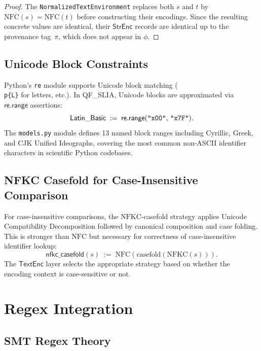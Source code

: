 \documentclass[11pt]{article}
\newcommand{\StrEnc}{\ensuremath{\mathsf{StrEnc}}}
\newcommand{\TextEnc}{\ensuremath{\mathsf{TextEnc}}}
\newcommand{\QFSLIA}{\textsf{QF\_SLIA}}
\newcommand{\NFC}{\ensuremath{\mathrm{NFC}}}
\newcommand{\NFKC}{\ensuremath{\mathrm{NFKC}}}
\newcommand{\rerange}[2]{\ensuremath{\mathsf{re.range}(#1,\,#2)}}
\begin{document}
\begin{proof}
The \texttt{NormalizedTextEnvironment} replaces both $s$ and $t$ by
$\NFC(s) = \NFC(t)$ before constructing their encodings.  Since the resulting
concrete values are identical, their \StrEnc{} records are identical up to the
provenance tag~$\pi$, which does not appear in $\phi$.
\end{proof}

\subsection{Unicode Block Constraints}
\label{sec:unicode-blocks}

Python's \texttt{re} module supports Unicode block matching (\texttt{\\p\{L\}}
for letters, etc.).  In \QFSLIA{}, Unicode blocks are approximated via
$\mathsf{re.range}$ assertions:
\[
  \mathsf{Latin\_Basic} \;:=\;
    \rerange{\texttt{"\\x00"}}{\texttt{"\\x7F"}}.
\]
The \texttt{models.py} module defines 13 named block ranges including
Cyrillic, Greek, and CJK Unified Ideographs, covering the most common
non-ASCII identifier characters in scientific Python codebases.

\subsection{NFKC Casefold for Case-Insensitive Comparison}
\label{sec:nfkc}

For case-insensitive comparisons, the \NFKC{}-casefold strategy applies
Unicode Compatibility Decomposition followed by canonical composition and
case folding.  This is stronger than \NFC{} but necessary for correctness of
case-insensitive identifier lookup:
\[
  \mathsf{nfkc\_casefold}(s) \;:=\;
    \NFC(\mathrm{casefold}(\NFKC(s))).
\]
The \TextEnc{} layer selects the appropriate strategy based on whether the
encoding context is case-sensitive or not.

\section{Regex Integration}
\label{sec:regex}

\subsection{SMT Regex Theory}
\label{sec:smt-regex}
\end{document}
